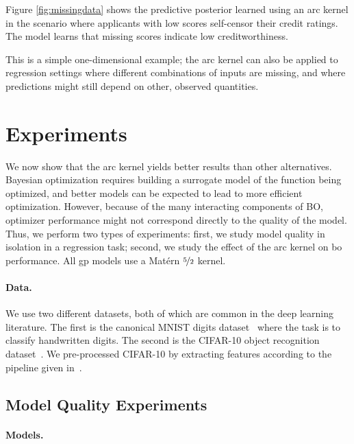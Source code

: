 \documentclass{article}
\newcommand{\bo}{{\sc bo}}
\newcommand{\gp}{{\sc gp}}
\begin{document}
Figure \ref {fig:missingdata} shows the predictive posterior learned using an arc kernel in the scenario where applicants with low scores self-censor their credit ratings.
The model learns that missing scores indicate low creditworthiness.

This is a simple one-dimensional example; the arc kernel can also be applied to regression settings where different combinations of inputs are missing, and where predictions might still depend on other, observed quantities.





\section{Experiments}
\vspace{-0.05in} 

We now show that the arc kernel yields better results than other alternatives. 
Bayesian optimization requires building a surrogate model of the function being optimized, and better models can be expected to lead to more efficient optimization.
However, because of the many interacting components of BO, optimizer performance might not correspond directly to the quality of the model.
Thus, we perform two types of experiments: first, we study model quality in isolation in a regression task; second, we study the effect of the arc kernel on \bo{} performance.
All \gp{} models use a Mat\'{e}rn $\nicefrac{5}{2}$ kernel.

\paragraph{Data.}
We use two different datasets, both of which are common in the deep learning literature.
The first is the canonical MNIST digits dataset~\cite{lecun-1998a} where the task is to classify handwritten digits.
The second is the CIFAR-10 object recognition dataset~\cite{Krizhevsky-2009a}.
We pre-processed CIFAR-10 by extracting features according to the pipeline given in~\cite{coates2010analysis}.

\subsection{Model Quality Experiments}   

\paragraph{Models.}
\end{document}
